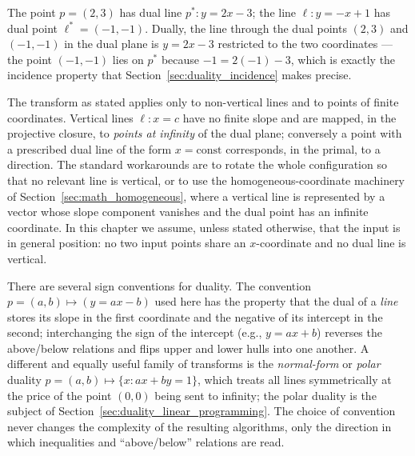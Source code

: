 \begin{example}\label{ex:geo_duality_basic}
  The point $p = (2,3)$ has dual line $p^* : y = 2x - 3$; the line
  $\ell : y = -x + 1$ has dual point $\ell^* = (-1, -1)$. Dually, the line
  through the dual points $(2,3)$ and $(-1,-1)$ in the dual plane is
  $y = 2x - 3$ restricted to the two coordinates --- the point $(-1,-1)$
  lies on $p^*$ because $-1 = 2(-1) - 3$, which is exactly the incidence
  property that Section~\ref{sec:duality_incidence} makes precise.
\end{example}

The transform as stated applies only to non-vertical lines and to points of
finite coordinates. Vertical lines $\ell : x = c$ have no finite slope and
are mapped, in the projective closure, to \emph{points at infinity} of the
dual plane; conversely a point with a prescribed dual line of the form
$x = \text{const}$ corresponds, in the primal, to a direction. The standard
workarounds are to rotate the whole configuration so that no relevant line
is vertical, or to use the homogeneous-coordinate machinery of
Section~\ref{sec:math_homogeneous}, where a vertical line is represented by
a vector whose slope component vanishes and the dual point has an infinite
coordinate. In this chapter we assume, unless stated otherwise, that the
input is in general position: no two input points share an $x$-coordinate
and no dual line is vertical.

\begin{remark}\label{rem:geo_duality_conventions}
  There are several sign conventions for duality. The convention
  $p = (a,b) \mapsto (y = ax - b)$ used here has the property that the dual
  of a \emph{line} stores its slope in the first coordinate and the negative
  of its intercept in the second; interchanging the sign of the intercept
  (e.g., $y = ax + b$) reverses the above/below relations and flips upper
  and lower hulls into one another. A different and equally useful family of
  transforms is the \emph{normal-form} or \emph{polar} duality
  $p = (a,b) \mapsto \{ x : a x + b y = 1 \}$, which treats all lines
  symmetrically at the price of the point $(0,0)$ being sent to infinity;
  the polar duality is the subject of
  Section~\ref{sec:duality_linear_programming}. The choice of convention
  never changes the complexity of the resulting algorithms, only the
  direction in which inequalities and ``above/below'' relations are read.
\end{remark}

